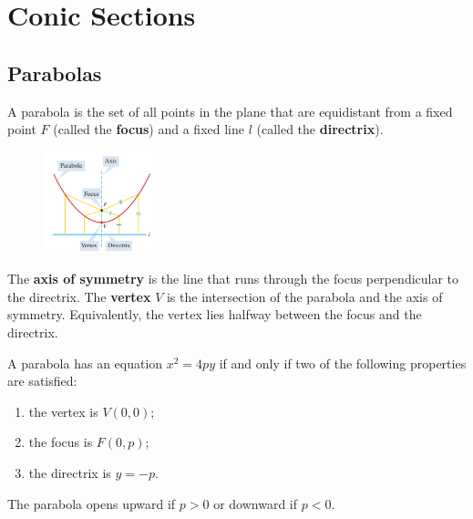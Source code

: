 
\chapter{Conic Sections}

\section{Parabolas}


\begin{definition}

A parabola is the set of all points in the plane that are equidistant from a fixed point $F$ (called the \textbf{focus}) and a fixed line $l$ (called the \textbf{directrix}).
\end{definition}
\begin{figure}
   \centering
   \includegraphics[width=0.3\textwidth,keepaspectratio]{figs/parabola-concepts.png}
\end{figure}
The \textbf{axis of symmetry} is the line that runs through the focus perpendicular to the directrix. The \textbf{vertex} $V$ is the intersection of the parabola and the axis of symmetry. Equivalently, the vertex lies halfway between the focus and the directrix.

\begin{theorem}
A parabola has an equation $x^2=4py$ if and only if two of the following properties are satisfied:
\begin{enumerate}[sepno]
    \item the vertex is $V(0, 0)$;
    \item the focus is $F(0, p)$;
    \item the directrix is $y=-p$.
\end{enumerate}

The parabola opens upward if $p>0$ or downward if $p<0$.
\end{theorem}

